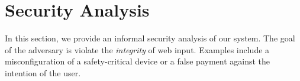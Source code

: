 \section{Security Analysis}
\label{sec:securityAnalysis}

In this section, we provide an informal security analysis of our system. The goal of the adversary is violate the \emph{integrity} of web input. Examples include a misconfiguration of a safety-critical device or a false payment against the intention of the user. 


%
%



